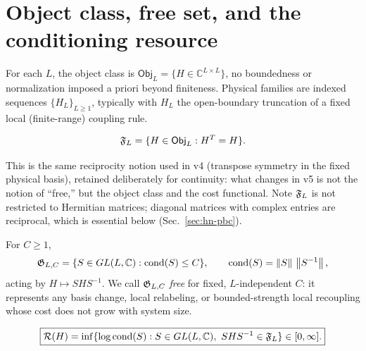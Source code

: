 \section{Object class, free set, and the conditioning resource}
\label{sec:setup}

\begin{definition}
For each $L$, the object class is
$\mathsf{Obj}_L=\{H\in\mathbb C^{L\times L}\}$, no boundedness or
normalization imposed a priori beyond finiteness. Physical families
are indexed sequences $\{H_L\}_{L\ge1}$, typically with $H_L$ the
open-boundary truncation of a fixed local (finite-range) coupling
rule.
\end{definition}

\begin{definition}
\begin{equation}
\mathfrak F_L=\{H\in\mathsf{Obj}_L: H^T=H\}.
\end{equation}
\end{definition}
This is the same reciprocity notion used in v4 (transpose symmetry
in the fixed physical basis), retained deliberately for continuity:
what changes in v5 is not the notion of ``free,'' but the object
class and the cost functional. Note $\mathfrak F_L$ is not restricted to
Hermitian matrices; diagonal matrices with complex entries are
reciprocal, which is essential below (Sec.~\ref{sec:hn-pbc}).

\begin{definition}
For $C\ge1$,
\begin{equation}
\mathfrak G_{L,C}=\{S\in GL(L,\mathbb C):\operatorname{cond}(S)\le C\},
\qquad
\operatorname{cond}(S)=\left\lVert S\right\rVert\,\left\lVert S^{-1}\right\rVert,
\end{equation}
acting by $H\mapsto SHS^{-1}$. We call $\mathfrak G_{L,C}$ \emph{free}
for fixed, $L$-independent $C$: it represents any basis change,
local relabeling, or bounded-strength local recoupling whose cost
does not grow with system size.
\end{definition}

\begin{definition}
\label{def:Rres}
\begin{equation}
\boxed{
\mathcal R(H)=\inf\{\log\operatorname{cond}(S): S\in GL(L,\mathbb C),\ SHS^{-1}\in\mathfrak F_L\}
\in[0,\infty].}
\end{equation}
\end{definition}

